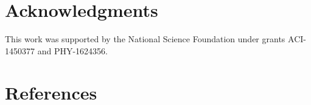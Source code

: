 \documentclass[a4paper]{jpconf}
\begin{document}






\section{Acknowledgments}

This work was supported by the National Science Foundation under grants ACI-1450377 and PHY-1624356.

\section*{References}
{}

\end{document}
